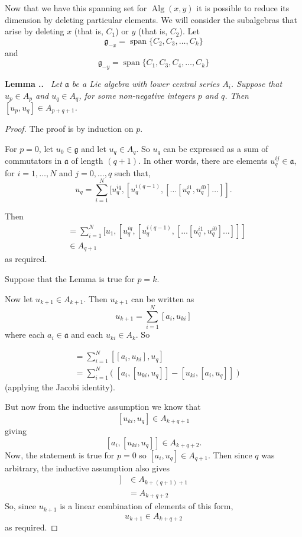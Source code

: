 \documentclass[honours]{UNSWthesis}
\newcommand{\g}{\mathfrak{g}}
\newcommand{\1}{\mathbf{e}_{1}}
\newcommand{\2}{\mathbf{e}_{3}}
\newcommand{\3}{\mathbf{e}_{3}}
\DeclareMathOperator{\alg}{Alg}
\DeclareMathOperator{\spn}{span}
\newcounter{Item}[section]
\newenvironment{Lemma}{\medskip
                            \refstepcounter{Item}
                            \noindent
                           {\bf Lemma \thesection.\theItem.}\ %
                            \begingroup \sl}
                           {\endgroup\medskip}
\begin{document}
Now that we have this spanning set for $\alg(x,y)$ it is possible to reduce its dimension by deleting particular elements. We will consider the subalgebras that arise by deleting $x$ (that is, $C_{1}$) or $y$ (that is, $C_{2}$). \newline
Let 
\[
\g_{-x}=\spn \{ C_{2},C_{3},\ldots,C_{k} \}
\]
and
\[
\g_{-y}=\spn \{C_{1},C_{3},C_{4},\ldots,C_{k} \}
\]

\begin{Lemma}\label{gohigher}
Let $\mathfrak{a}$ be a Lie algebra with lower central series $A_{i}$. Suppose that $u_{p} \in A_{p}$ and $u_{q} \in A_{q}$, for some non-negative integers $p$ and $q$. Then $[u_p,u_q] \in A_{p+q+1}$. 
\end{Lemma}
\begin{proof}
The proof is by induction on $p$. 

For $p=0$, let $u_{0} \in \g$ and let $u_{q} \in A_{q}$. So $u_{q}$ can be expressed as a sum of commutators in $\mathfrak{a}$ of length $(q+1)$. In other words, there are elements $u_{q}^{ij} \in \mathfrak{a}$, for $i=1, \ldots ,N$ and $j=0, \ldots , q$ such that,
\[
u_{q}= \sum\limits_{i=1}^{N} [u_{q}^{iq},[u_{q}^{i(q-1)},[\ldots[u_{q}^{i1}, u_{q}^{i0}]\ldots]].
\]

Then 
\begin{align*}
[u_{1},u_{q}] &= \sum\limits_{i=1}^{N} [u_1,[u_{q}^{iq},[u_{q}^{i(q-1)},[\ldots[u_{q}^{i1}, u_{q}^{i0}]\ldots]]] \\
& \in A_{q+1}
\end{align*}
as required. 

Suppose that the Lemma is true for $p=k$. 

Now let $u_{k+1} \in A_{k+1}$. Then $u_{k+1}$ can be written as 
\[
u_{k+1} = \sum\limits_{i=1}^{N} [a_{i}, u_{ki}]
\]
where each $a_i \in \mathfrak{a}$ and each $u_{ki} \in A_{k}$. So 

\begin{align*}
[u_{k+1}, u_{q}] &= \sum\limits_{i=1}^{N} [[a_{i}, u_{ki}],u_q] \\
&= \sum\limits_{i=1}^{N}\big(\; [a_{i},[ u_{ki},u_q]] -[u_{ki},[a_i,u_q]]\; \big)
\end{align*}
(applying the Jacobi identity). 

But now from the inductive assumption we know that 
\[
[u_{ki},u_{q}] \in A_{k+q+1}
\]
giving
\[
[a_i,[u_{ki},u_{q}]] \in A_{k+q+2}.
\]
Now, the statement is true for $p=0$ so  $[a_i,u_q]\in A_{q+1}$. Then since $q$ was arbitrary, the inductive assumption also gives
\begin{align*}
[u_{ki},[a_i,u_q]] &\in A_{k+(q+1)+1} \\
&= A_{k+q+2}
\end{align*}
So, since $u_{k+1}$ is a linear combination of elements of this form, 
\[
u_{k+1} \in A_{k+q+2}
\]
as required.
\end{proof}
\end{document}
